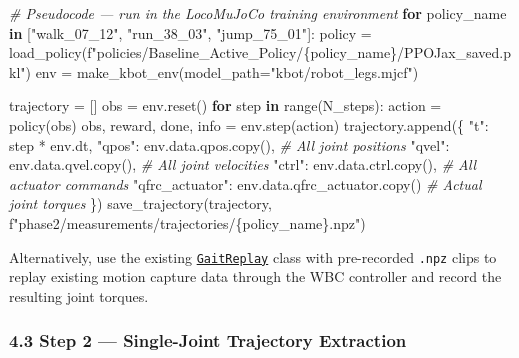 \documentclass[
]{article}
\newenvironment{Shaded}{}{}
\newcommand{\BuiltInTok}[1]{\textcolor[rgb]{0.00,0.50,0.00}{#1}}
\newcommand{\CommentTok}[1]{\textcolor[rgb]{0.38,0.63,0.69}{\textit{#1}}}
\newcommand{\ControlFlowTok}[1]{\textcolor[rgb]{0.00,0.44,0.13}{\textbf{#1}}}
\newcommand{\KeywordTok}[1]{\textcolor[rgb]{0.00,0.44,0.13}{\textbf{#1}}}
\newcommand{\NormalTok}[1]{#1}
\newcommand{\OperatorTok}[1]{\textcolor[rgb]{0.40,0.40,0.40}{#1}}
\newcommand{\SpecialCharTok}[1]{\textcolor[rgb]{0.25,0.44,0.63}{#1}}
\newcommand{\SpecialStringTok}[1]{\textcolor[rgb]{0.73,0.40,0.53}{#1}}
\newcommand{\StringTok}[1]{\textcolor[rgb]{0.25,0.44,0.63}{#1}}
\begin{document}
\begin{Shaded}
\begin{Highlighting}[]
\CommentTok{\# Pseudocode — run in the LocoMuJoCo training environment}
\ControlFlowTok{for}\NormalTok{ policy\_name }\KeywordTok{in}\NormalTok{ [}\StringTok{"walk\_07\_12"}\NormalTok{, }\StringTok{"run\_38\_03"}\NormalTok{, }\StringTok{"jump\_75\_01"}\NormalTok{]:}
\NormalTok{    policy }\OperatorTok{=}\NormalTok{ load\_policy(}\SpecialStringTok{f"policies/Baseline\_Active\_Policy/}\SpecialCharTok{\{}\NormalTok{policy\_name}\SpecialCharTok{\}}\SpecialStringTok{/PPOJax\_saved.pkl"}\NormalTok{)}
\NormalTok{    env }\OperatorTok{=}\NormalTok{ make\_kbot\_env(model\_path}\OperatorTok{=}\StringTok{"kbot/robot\_legs.mjcf"}\NormalTok{)}
    
\NormalTok{    trajectory }\OperatorTok{=}\NormalTok{ []}
\NormalTok{    obs }\OperatorTok{=}\NormalTok{ env.reset()}
    \ControlFlowTok{for}\NormalTok{ step }\KeywordTok{in} \BuiltInTok{range}\NormalTok{(N\_steps):}
\NormalTok{        action }\OperatorTok{=}\NormalTok{ policy(obs)}
\NormalTok{        obs, reward, done, info }\OperatorTok{=}\NormalTok{ env.step(action)}
\NormalTok{        trajectory.append(\{}
            \StringTok{"t"}\NormalTok{: step }\OperatorTok{*}\NormalTok{ env.dt,}
            \StringTok{"qpos"}\NormalTok{: env.data.qpos.copy(),        }\CommentTok{\# All joint positions}
            \StringTok{"qvel"}\NormalTok{: env.data.qvel.copy(),        }\CommentTok{\# All joint velocities  }
            \StringTok{"ctrl"}\NormalTok{: env.data.ctrl.copy(),        }\CommentTok{\# All actuator commands}
            \StringTok{"qfrc\_actuator"}\NormalTok{: env.data.qfrc\_actuator.copy()  }\CommentTok{\# Actual joint torques}
\NormalTok{        \})}
\NormalTok{    save\_trajectory(trajectory, }\SpecialStringTok{f"phase2/measurements/trajectories/}\SpecialCharTok{\{}\NormalTok{policy\_name}\SpecialCharTok{\}}\SpecialStringTok{.npz"}\NormalTok{)}
\end{Highlighting}
\end{Shaded}

Alternatively, use the existing
\href{../../MuJoCo/controllers/gait_replay.py}{\texttt{GaitReplay}}
class with pre-recorded \texttt{.npz} clips to replay existing motion
capture data through the WBC controller and record the resulting joint
torques.

\subsubsection{4.3 Step 2 --- Single-Joint Trajectory
Extraction}\label{step-2-single-joint-trajectory-extraction}
\end{document}
